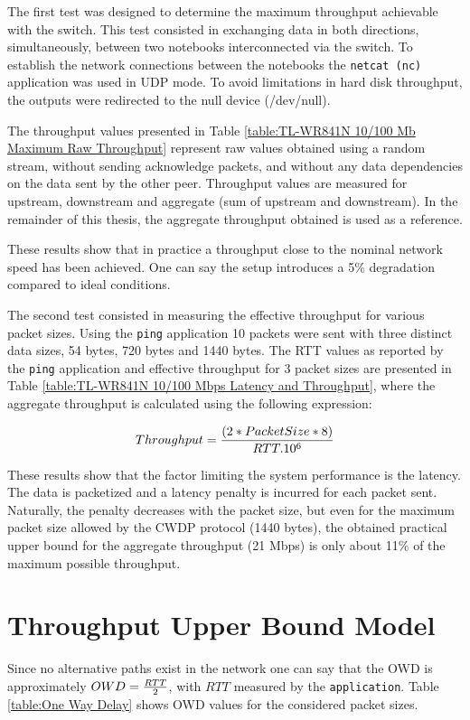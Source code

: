 \documentclass[defaultstyle,10pt,master,Helvetica]{thesis}
\begin{document}
The first test was designed to determine the maximum throughput achievable with the switch. This test  consisted in exchanging data in both directions, simultaneously, between two notebooks interconnected via the switch. To establish the network connections between the notebooks the {\tt netcat (nc)} application was used in \ac{UDP} mode. To avoid limitations in hard disk throughput, the outputs were redirected to the null device (/dev/null).

The throughput values presented in Table \ref{table:TL-WR841N 10/100 Mb Maximum Raw Throughput} represent raw values obtained using a random stream, without sending acknowledge packets, and without any data dependencies on the data sent by the other peer. Throughput values are measured for upstream, downstream and aggregate (sum of upstream and downstream). In the remainder of this thesis, the aggregate throughput obtained is used as a reference.



These results show that in practice a throughput close to the nominal network speed has been achieved. One can say the setup introduces a 5\% degradation compared to ideal conditions.

The second test consisted in measuring the effective throughput for various packet sizes. Using the {\tt ping} application 10 packets were sent with three distinct data sizes, 54 bytes, 720 bytes and 1440 bytes. The \ac{RTT} values as reported by the {\tt ping} application and effective throughput for 3 packet sizes are presented in Table \ref{table:TL-WR841N 10/100 Mbps Latency and Throughput}, where the aggregate throughput is calculated using the following expression:

\begin{equation}
Throughput = {(2 * Packet Size * 8) \over {RTT . 10^{6}}}
\end{equation}

These results show that the factor limiting the system performance is the latency. The data is packetized and a latency penalty is incurred for each packet sent. Naturally, the penalty decreases with the packet size, but even for the maximum packet size allowed by the CWDP protocol (1440 bytes), the obtained practical upper bound for the aggregate throughput (21 Mbps) is only about 11\% of the maximum possible throughput.



\clearpage
\section{Throughput Upper Bound Model}
\label{sec:upperbound}
Since no alternative paths exist in the network one can say that the \ac{OWD} is approximately $OWD={RTT\over 2}$, with $RTT$ measured by the {\tt application}. Table \ref{table:One Way Delay} shows OWD values for the considered packet sizes.
\end{document}
